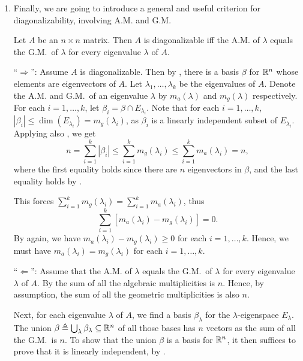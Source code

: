 \begin{enumerate}
\item Finally, we are going to introduce a general and useful criterion for
diagonalizability, involving A.M. and G.M.

\begin{theorem}
\label{thm:am-gm-diag-crit}
Let \(A\) be an \(n\times n\) matrix. Then \(A\) is diagonalizable iff the A.M.
of \(\lambda\) equals the G.M.\ of \(\lambda\) for every eigenvalue \(\lambda\)
of \(A\).
\end{theorem}
\begin{pf}
``\(\Rightarrow\)'': Assume \(A\) is diagonalizable. Then by
, there is a basis \(\beta\) for \(\mathbb{R}^n\) whose elements
are eigenvectors of \(A\). Let \(\lambda_1,\dotsc,\lambda_k\) be the
eigenvalues of \(A\). Denote the A.M. and G.M.\ of an eigenvalue \(\lambda\) by
\(m_{a}(\lambda)\) and \(m_{g}(\lambda)\) respectively. For each
\(i=1,\dotsc,k\), let \(\beta_i=\beta\cap E_{\lambda_i}\). Note that for each
\(i=1,\dotsc,k\), \(|\beta_i|\le\dim(E_{\lambda_i})=m_{g}(\lambda_i)\), as
\(\beta_i\) is a linearly independent subset of \(E_{\lambda_i}\). Applying
also , we get
\[
n=\sum_{i=1}^{k}|\beta_i|\le\sum_{i=1}^{k}m_{g}(\lambda_i)\le\sum_{i=1}^{k}m_a(\lambda_i)=n,
\]
where the first equality holds since there are \(n\) eigenvectors in \(\beta\),
and the last equality holds by .

This forces \(\sum_{i=1}^{k}m_{g}(\lambda_i)=\sum_{i=1}^{k}m_{a}(\lambda_i)\),
thus
\[
\sum_{i=1}^{k}[m_{a}(\lambda_i)-m_{g}(\lambda_i)]=0.
\]
By  again, we have \(m_a(\lambda_i)-m_g(\lambda_i)\ge 0\)
for each \(i=1,\dotsc,k\). Hence, we must have
\(m_a(\lambda_i)=m_{g}(\lambda_i)\) for each \(i=1,\dotsc,k\).

``\(\Leftarrow\)'': Assume that the A.M. of \(\lambda\) equals the G.M.\ of
\(\lambda\) for every eigenvalue \(\lambda\) of \(A\). By
 the sum of all the algebraic multiplicities is \(n\).
Hence, by assumption, the sum of all the geometric multiplicities is also
\(n\).

Next, for each eigenvalue \(\lambda\) of \(A\), we find a basis
\(\beta_{\lambda}\) for the \(\lambda\)-eigenspace \(E_{\lambda}\). The union
\(\beta\triangleq\bigcup_{\lambda}\beta_{\lambda}\subseteq \mathbb{R}^n\) of all those
bases has \(n\) vectors as the sum of all the G.M.\ is \(n\). To show that the
union \(\beta\) is a basis for \(\mathbb{R}^n\), it then suffices to prove that it is
linearly independent, by .


\end{pf}
\end{enumerate}
